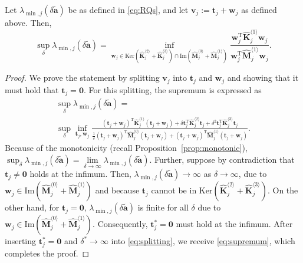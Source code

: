 \documentclass[10pt,a4paper]{amsart}
\begin{document}
\begin{proposition}\label{prop:supremum}
Let $\lambda_{\min,j}(\delta \tilde{\mathbf{a}})$ be as defined in \eqref{eq:RQs}, and let $\mathbf{v}_j := \mathbf{t}_j + \mathbf{w}_j$ as defined above. Then, 
\begin{equation}\label{eq:supremum}
	\sup_{\delta} \lambda_{\min,j}(\delta \tilde{\mathbf{a}}) = \inf_{\mathbf{w}_j \in \mathrm{Ker}\left(\hat{\mathbf{K}}_j^{\langle 2\rangle} + \hat{\mathbf{K}}_j^{\langle 3\rangle}\right) \cap \mathrm{Im}\left(\hat{\mathbf{M}}_j^{\langle 0\rangle} + \hat{\mathbf{M}}_j^{\langle 1\rangle}\right)} \frac{\mathbf{w}_j^\mathrm{T} \hat{\mathbf{K}}_j^{\langle 1\rangle}\mathbf{w}_j}{\mathbf{w}_j^\mathrm{T} \hat{\mathbf{M}}_j^{\langle 1\rangle} \mathbf{w}_j}.
\end{equation}
\begin{proof}
We prove the statement by splitting $\mathbf{v}_j$ into $\mathbf{t}_j$ and $\mathbf{w}_j$ and showing that it must hold that $\mathbf{t}_j=\mathbf{0}$.  For this splitting, the supremum is expressed as
\begin{equation}\label{eq:splitting}
	\begin{multlined}
		\sup_\delta \lambda_{\min,j}(\delta \tilde{\mathbf{a}})= \\
		\sup_\delta \inf\limits_{\mathbf{t}_j, \mathbf{w}_j}
		 \frac{\left(\mathbf{t}_j+\mathbf{w}_j\right)^\mathrm{T} \hat{\mathbf{K}}_j^{\langle 1\rangle}\left(\mathbf{t}_j+\mathbf{w}_j\right) + \delta\mathbf{t}_j^\mathrm{T} \hat{\mathbf{K}}_j^{\langle 2\rangle}\mathbf{t}_j + \delta^2\mathbf{t}_j^\mathrm{T} \hat{\mathbf{K}}_j^{\langle 3\rangle}\mathbf{t}_j }{\frac{1}{\delta}\left(\mathbf{t}_j+\mathbf{w}_j\right)^\mathrm{T} \hat{\mathbf{M}}_j^{\langle 0\rangle} \left(\mathbf{t}_j+\mathbf{w}_j\right) + \left(\mathbf{t}_j+\mathbf{w}_j\right)^\mathrm{T} \hat{\mathbf{M}}_j^{\langle 1\rangle} \left(\mathbf{t}_j+\mathbf{w}_j\right)}.
	\end{multlined}
\end{equation}
%
Because of the monotonicity (recall Proposition~\ref{prop:monotonic}), $\sup_\delta \lambda_{\min,j}(\delta \tilde{\mathbf{a}}) = \lim\limits_{\delta\rightarrow \infty}\lambda_{\min,j}(\delta \tilde{\mathbf{a}})$. Further, suppose by {contradiction} that $\mathbf{t}_j \neq \mathbf{0}$ holds at the infimum. Then, $\lambda_{\min,j}(\delta \tilde{\mathbf{a}}) \rightarrow \infty$ as $\delta \rightarrow \infty$, due to $\mathbf{w}_j \in \mathrm{Im}\left(\hat{\mathbf{M}}_j^{\langle 0\rangle} + \hat{\mathbf{M}}_j^{\langle 1\rangle}\right)$ and because $\mathbf{t}_j$ cannot be in $\mathrm{Ker}\left(\hat{\mathbf{K}}_j^{\langle 2\rangle} + \hat{\mathbf{K}}_j^{\langle 3\rangle}\right)$. On the other hand, for $\mathbf{t}_j = \mathbf{0}$, $\lambda_{\min,j}(\delta \tilde{\mathbf{a}})$ is finite for all $\delta$ due to $\mathbf{w}_j \in \mathrm{Im}\left(\hat{\mathbf{M}}_j^{\langle 0\rangle} + \hat{\mathbf{M}}_j^{\langle 1\rangle}\right)$. Consequently, $\mathbf{t}_j^*=\mathbf{0}$ must hold at the infimum. After inserting $\mathbf{t}_j^*=\mathbf{0}$ and $\delta^*\rightarrow \infty$ into \eqref{eq:splitting}, we receive \eqref{eq:supremum}, which completes the proof.
\end{proof}
\end{proposition}
\end{document}
